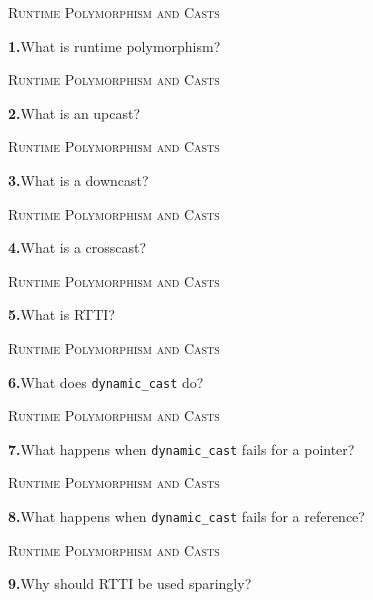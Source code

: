 \documentclass[11pt,a4paper]{article}
\newenvironment{questionblock}{%
  \begin{minipage}[t][0.455\textheight][t]{\textwidth}%
  \raggedright\small
}{%
  \vfill
  \end{minipage}%
}
\newcommand{\sectionlabel}[1]{\textsc{#1}\par\vspace{0.35em}}
\newcommand{\questionnumber}[1]{\textbf{#1.}\enspace}
\begin{document}
\newpage
\begin{questionblock}
\sectionlabel{Runtime Polymorphism and Casts}
\questionnumber{1}What is runtime polymorphism?\par
\end{questionblock}
\vspace*{0.04\textheight}
\begin{questionblock}
\sectionlabel{Runtime Polymorphism and Casts}
\questionnumber{2}What is an upcast?\par
\end{questionblock}
\newpage
\begin{questionblock}
\sectionlabel{Runtime Polymorphism and Casts}
\questionnumber{3}What is a downcast?\par
\end{questionblock}
\vspace*{0.04\textheight}
\begin{questionblock}
\sectionlabel{Runtime Polymorphism and Casts}
\questionnumber{4}What is a crosscast?\par
\end{questionblock}
\newpage
\begin{questionblock}
\sectionlabel{Runtime Polymorphism and Casts}
\questionnumber{5}What is RTTI?\par
\end{questionblock}
\vspace*{0.04\textheight}
\begin{questionblock}
\sectionlabel{Runtime Polymorphism and Casts}
\questionnumber{6}What does \verb|dynamic_cast| do?\par
\end{questionblock}
\newpage
\begin{questionblock}
\sectionlabel{Runtime Polymorphism and Casts}
\questionnumber{7}What happens when \verb|dynamic_cast| fails for a pointer?\par
\end{questionblock}
\vspace*{0.04\textheight}
\begin{questionblock}
\sectionlabel{Runtime Polymorphism and Casts}
\questionnumber{8}What happens when \verb|dynamic_cast| fails for a reference?\par
\end{questionblock}
\newpage
\begin{questionblock}
\sectionlabel{Runtime Polymorphism and Casts}
\questionnumber{9}Why should RTTI be used sparingly?\par
\end{questionblock}
\end{document}
